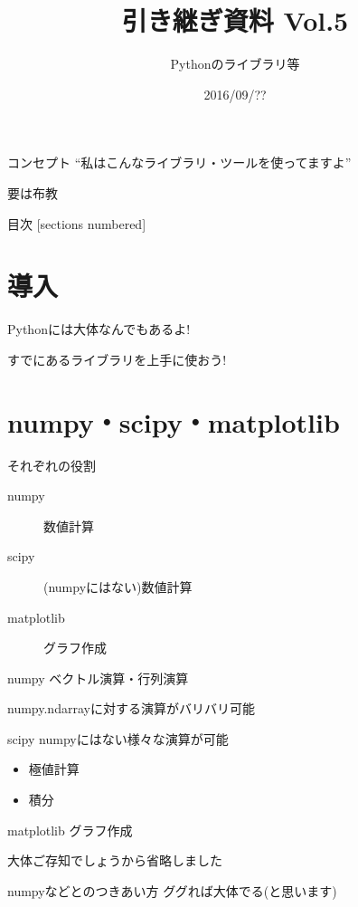 \documentclass[12pt, xetex, xcolor=pdftex, dvipsnames]{beamer}
\title{引き継ぎ資料 Vol.5}
\subtitle{Pythonのライブラリ等}
\date{2016/09/??}
\author{}
\institute{}
\begin{document}
\maketitle
\begin{frame}{コンセプト}
    ``私はこんなライブラリ・ツールを使ってますよ''

    要は布教
\end{frame}
\begin{frame}{目次}
  [sections numbered]
  \tableofcontents[hideallsubsections]
\end{frame}
\section{導入}
\begin{frame}
    Pythonには大体なんでもあるよ!
\end{frame}
\begin{frame}
    すでにあるライブラリを上手に使おう!
\end{frame}

\section{numpy・scipy・matplotlib}
\begin{frame}{それぞれの役割}
    \begin{description}
        \item[numpy] 数値計算
        \item[scipy] (numpyにはない)数値計算
        \item[matplotlib] グラフ作成
    \end{description}
\end{frame}
\begin{frame}{numpy}
    ベクトル演算・行列演算

    \pause
    numpy.ndarrayに対する演算がバリバリ可能
\end{frame}
\begin{frame}{scipy}
    numpyにはない様々な演算が可能

    \begin{itemize}
        \item 極値計算
        \item 積分
    \end{itemize}
\end{frame}
\begin{frame}{matplotlib}
    グラフ作成
\end{frame}
\begin{frame}
    大体ご存知でしょうから省略しました
\end{frame}
\begin{frame}{numpyなどとのつきあい方}
    ググれば大体でる(と思います)
\end{frame}
\end{document}
